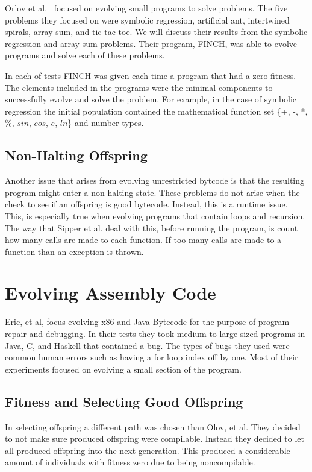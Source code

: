 \documentclass{sig-alternate}
\begin{document}
Orlov et al.~\cite{FINCH:2011} focused on evolving small programs to solve problems. The five problems they focused on were symbolic regression, artificial ant, intertwined spirals, array sum, and tic-tac-toe. We will discuss their results from the symbolic regression and array sum problems. Their program, FINCH, was able to evolve programs and solve each of these problems.

In each of tests FINCH was given each time a program that had a zero fitness. The elements included in the programs were the minimal components to successfully evolve and solve the problem. For example, in the case of symbolic regression the initial population contained the mathematical function set \{+, -, *, \%, $sin$, $cos$, $e$,  $ln$\} and number types.

\subsection{Non-Halting Offspring}
Another issue that arises from evolving unrestricted bytcode is that the resulting program might enter a non-halting state. These problems do not arise when the check to see if an offspring is good bytecode. Instead, this is a runtime issue. This, is especially true when evolving programs that contain loops and recursion.
The way that Sipper et al.\cite{FINCH:2011} deal with this, before running the program, is count how many calls are made to each function. If too many calls are made to a function than an exception is thrown.






\section{Evolving Assembly Code}
Eric, et al, focus evolving x86 and Java Bytecode for the purpose of program repair and debugging. In their tests they took medium to large sized programs in Java, C, and Haskell that contained a bug. The types of bugs they used were common human errors such as having a for loop index off by one. Most of their experiments focused on evolving a small section of the program.
\subsection{Fitness and Selecting Good Offspring } 
In selecting offspring a different path was chosen than Olov, et al. They decided to not make sure produced offspring were compilable. Instead they decided to let all produced offspring into the next generation. This produced a considerable amount of individuals with fitness zero due to being noncompilable. 
\end{document}
